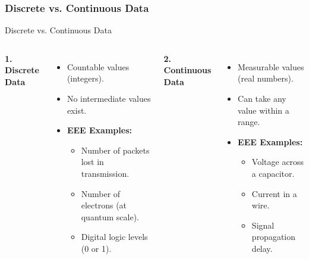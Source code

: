 \subsubsection{Discrete vs. Continuous Data}


\begin{frame}{Discrete vs. Continuous Data}
    \begin{columns}[T]
        \textbf{1. Discrete Data}
        \begin{itemize}
            \item Countable values (integers).
            \item No intermediate values exist.
            \item \textbf{EEE Examples:}
            \begin{itemize}
                \item Number of packets lost in transmission.
                \item Number of electrons (at quantum scale).
                \item Digital logic levels (0 or 1).
            \end{itemize}
        \end{itemize}

        \textbf{2. Continuous Data}
        \begin{itemize}
            \item Measurable values (real numbers).
            \item Can take any value within a range.
            \item \textbf{EEE Examples:}
            \begin{itemize}
                \item Voltage across a capacitor.
                \item Current in a wire.
                \item Signal propagation delay.
            \end{itemize}
        \end{itemize}
    \end{columns}
    

\end{frame}
